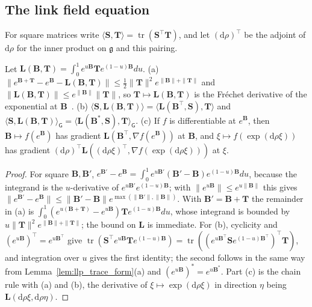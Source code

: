 \subsection{The link field equation}\label{app:llp_field}

For square matrices write $\langle\mathbf S,\mathbf T\rangle=\operatorname{tr}(\mathbf S^\top\mathbf T)$, and let $(\mathrm d\rho)^\top$ be the adjoint of $\mathrm d\rho$ for the inner product on $\mathfrak g$ and this pairing.

\begin{lemma}\label{lem:llp_exp_derivative}
Let $\mathbf L(\mathbf B,\mathbf T)=\int_0^1e^{u\mathbf B}\mathbf Te^{(1-u)\mathbf B}du$.
(a) $\|e^{\mathbf B+\mathbf T}-e^{\mathbf B}-\mathbf L(\mathbf B,\mathbf T)\|\leq\frac12\|\mathbf T\|^2e^{\|\mathbf B\|+\|\mathbf T\|}$ and $\|\mathbf L(\mathbf B,\mathbf T)\|\leq e^{\|\mathbf B\|}\|\mathbf T\|$, so $\mathbf T\mapsto\mathbf L(\mathbf B,\mathbf T)$ is the Fr\'echet derivative of the exponential at $\mathbf B$~\cite{Higham2008}.
(b) $\langle\mathbf S,\mathbf L(\mathbf B,\mathbf T)\rangle=\langle\mathbf L(\mathbf B^\top,\mathbf S),\mathbf T\rangle$ and $\langle\mathbf S,\mathbf L(\mathbf B,\mathbf T)\rangle_{\mathsf G}=\langle\mathbf L(\mathbf B^*,\mathbf S),\mathbf T\rangle_{\mathsf G}$.
(c) If $f$ is differentiable at $e^{\mathbf B}$, then $\mathbf B\mapsto f(e^{\mathbf B})$ has gradient $\mathbf L(\mathbf B^\top,\nabla f(e^{\mathbf B}))$ at $\mathbf B$, and $\xi\mapsto f(\exp(\mathrm d\rho\xi))$ has gradient $(\mathrm d\rho)^\top\mathbf L((\mathrm d\rho\xi)^\top,\nabla f(\exp(\mathrm d\rho\xi)))$ at $\xi$.
\end{lemma}

\begin{proof}
For square $\mathbf B,\mathbf B'$, $e^{\mathbf B'}-e^{\mathbf B}=\int_0^1e^{u\mathbf B'}(\mathbf B'-\mathbf B)e^{(1-u)\mathbf B}du$, because the integrand is the $u$-derivative of $e^{u\mathbf B'}e^{(1-u)\mathbf B}$; with $\|e^{u\mathbf B}\|\leq e^{u\|\mathbf B\|}$ this gives $\|e^{\mathbf B'}-e^{\mathbf B}\|\leq\|\mathbf B'-\mathbf B\|e^{\max(\|\mathbf B'\|,\|\mathbf B\|)}$. With $\mathbf B'=\mathbf B+\mathbf T$ the remainder in (a) is $\int_0^1(e^{u(\mathbf B+\mathbf T)}-e^{u\mathbf B})\mathbf Te^{(1-u)\mathbf B}du$, whose integrand is bounded by $u\|\mathbf T\|^2e^{\|\mathbf B\|+\|\mathbf T\|}$; the bound on $\mathbf L$ is immediate. For (b), cyclicity and $(e^{u\mathbf B})^\top=e^{u\mathbf B^\top}$ give $\operatorname{tr}(\mathbf S^\top e^{u\mathbf B}\mathbf Te^{(1-u)\mathbf B})=\operatorname{tr}((e^{u\mathbf B^\top}\mathbf Se^{(1-u)\mathbf B^\top})^\top\mathbf T)$, and integration over $u$ gives the first identity; the second follows in the same way from Lemma~\ref{lem:llp_trace_form}(a) and $(e^{u\mathbf B})^*=e^{u\mathbf B^*}$. Part (c) is the chain rule with (a) and (b), the derivative of $\xi\mapsto\exp(\mathrm d\rho\xi)$ in direction $\eta$ being $\mathbf L(\mathrm d\rho\xi,\mathrm d\rho\eta)$.
\end{proof}

